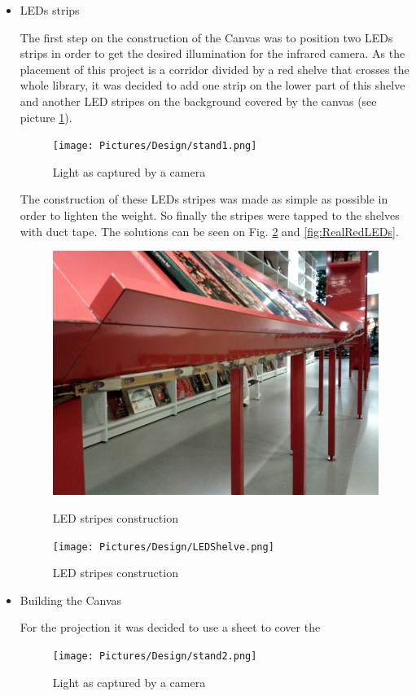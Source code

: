 \begin{itemize}
\item LEDs strips

The first step on the construction of the Canvas was to position two LEDs strips in order to get the desired illumination for the infrared camera. As the placement of this project is a corridor divided by a red shelve that crosses the whole library, it was decided to add one strip on the lower part of this shelve and another LED stripes on the background covered by the canvas (see picture \ref{fig:LEDsPosition}).

\begin{figure}[htbp] 
\centering 
\texttt{[image: Pictures/Design/stand1.png]} 
\caption{Light as captured by a camera} 
\label{fig:LEDsPosition} 
\end{figure}

The construction of these LEDs stripes was made as simple as possible in order to lighten the weight. So finally the stripes were tapped to the shelves with duct tape. The solutions can be seen on Fig. \ref{fig:RealLEDs} and \ref{fig:RealRedLEDs}.

\begin{figure}[htbp] \centering
\begin{minipage}[b]{0.45\textwidth} \centering
\includegraphics[width=1.00\textwidth]{Pictures/Design/LEDRedShelve.png}
\caption{LED stripes construction}
\label{fig:RealRedLEDs}
\end{minipage} \hfill
\begin{minipage}[b]{0.45\textwidth} \centering
\texttt{[image: Pictures/Design/LEDShelve.png]} 
\caption{LED stripes construction}
\label{fig:RealLEDs}
\end{minipage} \hfill
\end{figure}

\item Building the Canvas

For the projection it was decided to use a sheet to cover the 
\begin{figure}[htbp] 
\centering 
\texttt{[image: Pictures/Design/stand2.png]} 
\caption{Light as captured by a camera} 
\label{fig:CanvasPosition} 
\end{figure}

\end{itemize}

